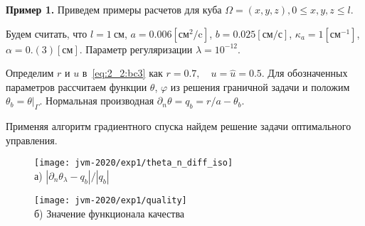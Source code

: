 
\begin{frame}
    \textbf{Пример 1.}
    Приведем примеры расчетов для куба $\Omega = {(x, y, z), 0 \leq x,y,z \leq l}$.

    Будем считать, что $l=1~\text{см}$, $a = 0.006[\text{см}^2/\text{c}]$,
    $b=0.025[\text{см}/\text{с}]$, $\kappa_a=1[\text{см}^{-1}]$, $\alpha = 0.(3)[\text{см}]$.
    Параметр регуляризации $\lambda=10^{-12}$.

    Определим $r$ и $u$ в~\eqref{eq:2_2:bc3} как $r = 0.7, \quad u = \hat u = 0.5$.
    Для обозначенных параметров рассчитаем функции $\theta$, $\varphi$ из решения граничной задачи
    и положим $\theta_b = \theta|_\Gamma$.
    Нормальная производная $\partial_n \theta = q_b = r / a - \theta_b$.

    Применяя алгоритм градиентного спуска найдем решение задачи оптимального управления.
    \begin{figure}[h!t]
        \begin{minipage}[b][][b]{0.49\linewidth}
            \centering
            \texttt{[image: jvm-2020/exp1/theta\_n\_diff\_iso]}
            \\ а) $|\partial_n\theta_\lambda-q_b|/|q_b|$
        \end{minipage}
        \hfill
        \begin{minipage}[b][][b]{0.49\linewidth}
            \centering
            \texttt{[image: jvm-2020/exp1/quality]}
            \\ б) Значение функционала качества
        \end{minipage}
        \label{fig:4_4:0}
    \end{figure}
\end{frame}

